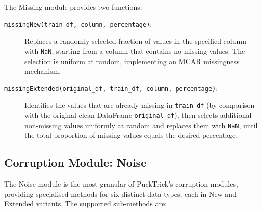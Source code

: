 The Missing module provides two functions:

\begin{description}
    \item[\texttt{missingNew(train\_df, column, percentage)}:]
        Replaces a randomly selected fraction of values in the specified column
        with \texttt{NaN}, starting from a column that contains no missing
        values.  The selection is uniform at random, implementing an MCAR
        missingness mechanism.

    \item[\texttt{missingExtended(original\_df, train\_df, column, percentage)}:]
        Identifies the values that are already missing in \texttt{train\_df}
        (by comparison with the original clean DataFrame
        \texttt{original\_df}), then selects additional non-missing values
        uniformly at random and replaces them with \texttt{NaN}, until the
        total proportion of missing values equals the desired percentage.
\end{description}


\subsection{Corruption Module: Noise}
\label{sec:pucktrick-noise}

The Noise module is the most granular of PuckTrick's corruption modules,
providing specialised methods for six distinct data types, each in New and
Extended variants.  The supported sub-methods are:

